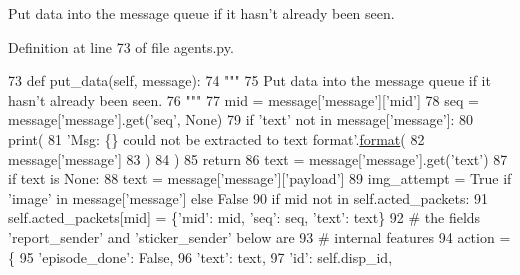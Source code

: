 \begin{DoxyVerb}Put data into the message queue if it hasn't already been seen.
\end{DoxyVerb}
 

Definition at line 73 of file agents.\+py.


\begin{DoxyCode}
73     \textcolor{keyword}{def }put\_data(self, message):
74         \textcolor{stringliteral}{"""}
75 \textcolor{stringliteral}{        Put data into the message queue if it hasn't already been seen.}
76 \textcolor{stringliteral}{        """}
77         mid = message[\textcolor{stringliteral}{'message'}][\textcolor{stringliteral}{'mid'}]
78         seq = message[\textcolor{stringliteral}{'message'}].get(\textcolor{stringliteral}{'seq'}, \textcolor{keywordtype}{None})
79         \textcolor{keywordflow}{if} \textcolor{stringliteral}{'text'} \textcolor{keywordflow}{not} \textcolor{keywordflow}{in} message[\textcolor{stringliteral}{'message'}]:
80             print(
81                 \textcolor{stringliteral}{'Msg: \{\} could not be extracted to text format'}.\hyperlink{namespaceparlai_1_1chat__service_1_1services_1_1messenger_1_1shared__utils_a32e2e2022b824fbaf80c747160b52a76}{format}(
82                     message[\textcolor{stringliteral}{'message'}]
83                 )
84             )
85             \textcolor{keywordflow}{return}
86         text = message[\textcolor{stringliteral}{'message'}].get(\textcolor{stringliteral}{'text'})
87         \textcolor{keywordflow}{if} text \textcolor{keywordflow}{is} \textcolor{keywordtype}{None}:
88             text = message[\textcolor{stringliteral}{'message'}][\textcolor{stringliteral}{'payload'}]
89         img\_attempt = \textcolor{keyword}{True} \textcolor{keywordflow}{if} \textcolor{stringliteral}{'image'} \textcolor{keywordflow}{in} message[\textcolor{stringliteral}{'message'}] \textcolor{keywordflow}{else} \textcolor{keyword}{False}
90         \textcolor{keywordflow}{if} mid \textcolor{keywordflow}{not} \textcolor{keywordflow}{in} self.acted\_packets:
91             self.acted\_packets[mid] = \{\textcolor{stringliteral}{'mid'}: mid, \textcolor{stringliteral}{'seq'}: seq, \textcolor{stringliteral}{'text'}: text\}
92             \textcolor{comment}{# the fields 'report\_sender' and 'sticker\_sender' below are}
93             \textcolor{comment}{# internal features}
94             action = \{
95                 \textcolor{stringliteral}{'episode\_done'}: \textcolor{keyword}{False},
96                 \textcolor{stringliteral}{'text'}: text,
97                 \textcolor{stringliteral}{'id'}: self.disp\_id,

\end{DoxyCode}

